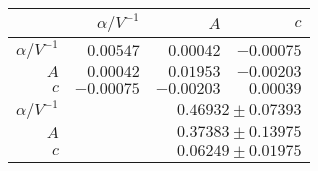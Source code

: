 \begin{table}
\caption{}
\centering
 \begin{tabular}{|r|r|r|r|}
 \hline 
\cellcolor{tabcolor}&\cellcolor{tabcolor}$\alpha/ V^{-1}$&\cellcolor{tabcolor}$A$&\cellcolor{tabcolor}$c$\\ \hline 
 \cellcolor{tabcolor}$\alpha/ V^{-1}$&$0.00547$ &$0.00042$ &$-0.00075$ \\ 
\cellcolor{tabcolor}$A$&$0.00042$ &$0.01953$ &$-0.00203$ \\ 
\cellcolor{tabcolor}$c$&$-0.00075$ &$-0.00203$ &$0.00039$ \\ \hline \hline
\cellcolor{tabcolor}$\alpha/ V^{-1}$&\multicolumn{3}{r|}{$0.46932 \pm 0.07393$ }\\ 
\cellcolor{tabcolor}$A$&\multicolumn{3}{r|}{$0.37383 \pm 0.13975$ }\\ 
\cellcolor{tabcolor}$c$&\multicolumn{3}{r|}{$0.06249 \pm 0.01975$ }\\ 
\hline\end{tabular}
\end{table}
